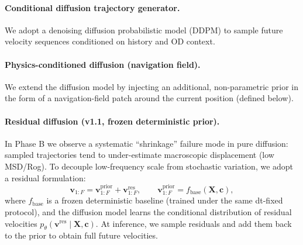 \paragraph{Conditional diffusion trajectory generator.}
We adopt a denoising diffusion probabilistic model (DDPM) \citep{ho2020ddpm} to sample future velocity sequences conditioned on history and OD context.

\paragraph{Physics-conditioned diffusion (navigation field).}
We extend the diffusion model by injecting an additional, non-parametric prior in the form of a navigation-field patch around the current position (defined below).

\paragraph{Residual diffusion (v1.1, frozen deterministic prior).}
In Phase B we observe a systematic ``shrinkage'' failure mode in pure diffusion: sampled trajectories tend to under-estimate macroscopic displacement (low MSD/Rog). To decouple low-frequency scale from stochastic variation, we adopt a residual formulation:
\begin{equation}
  \mathbf{v}_{1:F} = \mathbf{v}^{\mathrm{prior}}_{1:F} + \mathbf{v}^{\mathrm{res}}_{1:F},
  \qquad
  \mathbf{v}^{\mathrm{prior}}_{1:F} = f_{\mathrm{base}}(\mathbf{X}, \mathbf{c}),
  \label{eq:residual_decomp}
\end{equation}
where $f_{\mathrm{base}}$ is a frozen deterministic baseline (trained under the same dt-fixed protocol), and the diffusion model learns the conditional distribution of residual velocities $p_\theta(\mathbf{v}^{\mathrm{res}} \mid \mathbf{X},\mathbf{c})$. At inference, we sample residuals and add them back to the prior to obtain full future velocities.

